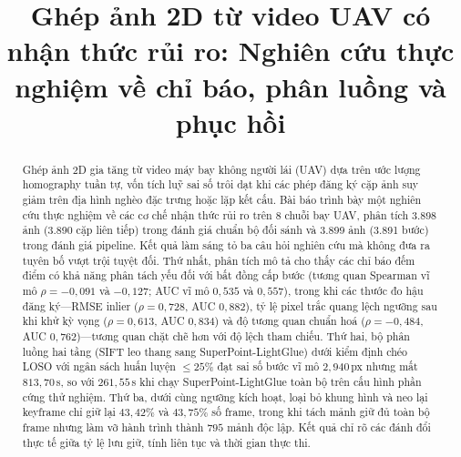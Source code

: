 \documentclass[conference]{IEEEtran}
\begin{document}
\title{Ghép ảnh 2D từ video UAV có nhận thức rủi ro: Nghiên cứu thực nghiệm về chỉ báo, phân luồng và phục hồi}

\author{
\and
{}
\and
{}
\and
{}
}

\maketitle

\begin{abstract}
Ghép ảnh 2D gia tăng từ video máy bay không người lái (UAV) dựa trên ước lượng homography tuần tự, vốn tích luỹ sai số trôi dạt khi các phép đăng ký cặp ảnh suy giảm trên địa hình nghèo đặc trưng hoặc lặp kết cấu. Bài báo trình bày một nghiên cứu thực nghiệm về các cơ chế nhận thức rủi ro trên 8 chuỗi bay UAV, phân tích 3.898 ảnh (3.890 cặp liên tiếp) trong đánh giá chuẩn bộ đối sánh và 3.899 ảnh (3.891 bước) trong đánh giá pipeline. Kết quả làm sáng tỏ ba câu hỏi nghiên cứu mà không đưa ra tuyên bố vượt trội tuyệt đối. Thứ nhất, phân tích mô tả cho thấy các chỉ báo đếm điểm có khả năng phân tách yếu đối với bất đồng cấp bước (tương quan Spearman vĩ mô $\rho = -0{,}091$ và $-0{,}127$; AUC vĩ mô $0{,}535$ và $0{,}557$), trong khi các thước đo hậu đăng ký---RMSE inlier ($\rho = 0{,}728$, AUC $0{,}882$), tỷ lệ pixel trắc quang lệch ngưỡng sau khi khử kỳ vọng ($\rho = 0{,}613$, AUC $0{,}834$) và độ tương quan chuẩn hoá ($\rho = -0{,}484$, AUC $0{,}762$)---tương quan chặt chẽ hơn với độ lệch tham chiếu. Thứ hai, bộ phân luồng hai tầng (SIFT leo thang sang SuperPoint-LightGlue) dưới kiểm định chéo LOSO với ngân sách huấn luyện $\le 25\%$ đạt sai số bước vĩ mô $2{,}940$\,px nhưng mất $813{,}70$\,s, so với $261{,}55$\,s khi chạy SuperPoint-LightGlue toàn bộ trên cấu hình phần cứng thử nghiệm. Thứ ba, dưới cùng ngưỡng kích hoạt, loại bỏ khung hình và neo lại keyframe chỉ giữ lại $43{,}42\%$ và $43{,}75\%$ số frame, trong khi tách mảnh giữ đủ toàn bộ frame nhưng làm vỡ hành trình thành $795$ mảnh độc lập. Kết quả chỉ rõ các đánh đổi thực tế giữa tỷ lệ lưu giữ, tính liên tục và thời gian thực thi.
\end{abstract}
\end{document}
